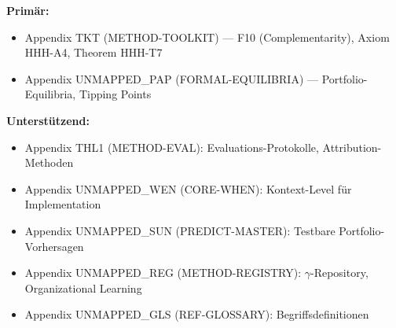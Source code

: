 \begin{tcolorbox}[colback=yellow!10!white, colframe=orange!75!black,
    title=Appendix References for This Chapter]

\textbf{Primär:}
\begin{itemize}[nosep]
\item Appendix TKT (METHOD-TOOLKIT) --- F10 (Complementarity), Axiom HHH-A4, Theorem HHH-T7
\item Appendix UNMAPPED_PAP (FORMAL-EQUILIBRIA) --- Portfolio-Equilibria, Tipping Points
\end{itemize}

\textbf{Unterstützend:}
\begin{itemize}[nosep]
\item Appendix THL1 (METHOD-EVAL): Evaluations-Protokolle, Attribution-Methoden
\item Appendix UNMAPPED_WEN (CORE-WHEN): Kontext-Level für Implementation
\item Appendix UNMAPPED_SUN (PREDICT-MASTER): Testbare Portfolio-Vorhersagen
\item Appendix UNMAPPED_REG (METHOD-REGISTRY): $\gamma$-Repository, Organizational Learning
\item Appendix UNMAPPED_GLS (REF-GLOSSARY): Begriffsdefinitionen
\end{itemize}
\end{tcolorbox}

